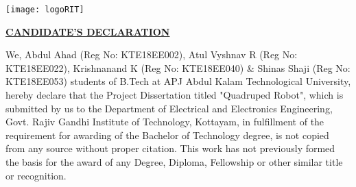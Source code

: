 \begin{center}

\begin{center}   
\texttt{[image: logoRIT]}
\end{center}
\vspace{0.5cm}
    
\vspace{2 cm}

\textbf{\underline{CANDIDATE'S DECLARATION}}\\
\vspace{0.5cm}
\end{center}

We, Abdul Ahad (Reg No: KTE18EE002), Atul Vyshnav R (Reg No: KTE18EE022), Krishnanand K (Reg No: KTE18EE040) \& Shinas Shaji (Reg No: KTE18EE053) students of B.Tech at APJ Abdul Kalam Technological University, hereby declare that the Project Dissertation titled "Quadruped Robot", which is submitted by us to the Department of Electrical and Electronics Engineering, Govt. Rajiv Gandhi Institute of Technology, Kottayam, in fulfillment of the requirement for awarding of the Bachelor of Technology degree, is not copied from any source without proper citation. This work has not previously formed the basis for the award of any Degree, Diploma, Fellowship or other similar title or recognition.


                         

